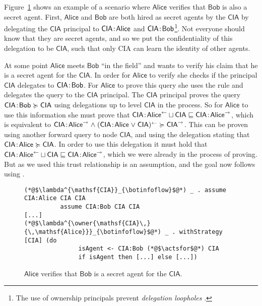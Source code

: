 Figure~\ref{fig:govt-alice-checks-bob} shows an example of a scenario where $\mathsf{Alice}$ verifies that $\mathsf{Bob}$ is also a secret agent. First, $\mathsf{Alice}$ and $\mathsf{Bob}$ are both hired as secret agents by the $\mathsf{CIA}$ by delegating the $\mathsf{CIA}$ principal to $\mathsf{CIA}\!:\!\mathsf{Alice}$ and $\mathsf{CIA}\!:\!\mathsf{Bob}$\footnote{The use of ownership principals prevent \emph{delegation loopholes} \cite{Arden:2015:FA:2859845.2859998}.}. Not everyone should know that they are secret agents, and so we put the confidentiality of this delegation to be $\mathsf{CIA}$, such that only CIA can learn the identity of other agents.

At some point $\mathsf{Alice}$ meets $\mathsf{Bob}$ ``in the field'' and wants to verify his claim that he is a secret agent for the $\mathsf{CIA}$. In order for $\mathsf{Alice}$ to verify she checks if the principal $\mathsf{CIA}$ delegates to $\mathsf{CIA}\!:\!\mathsf{Bob}$. For $\mathsf{Alice}$ to prove this query she uses the  rule and delegates the query to the $\mathsf{CIA}$ principal. The $\mathsf{CIA}$ principal proves the query $\mathsf{CIA}\!:\!\mathsf{Bob} \succcurlyeq \mathsf{CIA}$ using delegations up to level $\mathsf{CIA}$ in the process. So for $\mathsf{Alice}$ to use this information she must prove that $\mathsf{CIA}\!:\!\mathsf{Alice}^{\leftarrow} \sqcup \mathsf{CIA} \sqsubseteq \mathsf{CIA}\!:\!\mathsf{Alice}^{\rightarrow}$, which is equivalent to $\mathsf{CIA}\!:\!\mathsf{Alice}^{\rightarrow} \mathrel{\land} (\mathsf{CIA}\!:\!\mathsf{Alice} \mathrel{\lor} \mathsf{CIA})^{\leftarrow} \succcurlyeq \mathsf{CIA}^{\rightarrow}$. This can be proven using another forward query to node $\mathsf{CIA}$, and using the delegation stating that $\mathsf{CIA}\!:\!\mathsf{Alice} \succcurlyeq \mathsf{CIA}$. In order to use this delegation it must hold that $\mathsf{CIA}\!:\!\mathsf{Alice}^{\leftarrow} \sqcup \mathsf{CIA} \sqsubseteq \mathsf{CIA}\!:\!\mathsf{Alice}^{\rightarrow}$, which we were already in the process of proving. But as we used  this trust relationship is an assumption, and the goal now follows using .

\begin{figure}
\centering
\begin{lstlisting}
(*@$\lambda^{\mathsf{CIA}}_{\botinfoflow}$@*) _ . assume CIA:Alice CIA CIA
          assume CIA:Bob CIA CIA
[...]
(*@$\lambda^{\owner{\mathsf{CIA}\,}{\,\mathsf{Alice}}}_{\botinfoflow}$@*) _ . withStrategy [CIA] (do
               isAgent <- CIA:Bob (*@$\actsfor$@*) CIA
               if isAgent then [...] else [...])
\end{lstlisting}
\caption{$\mathsf{Alice}$ verifies that $\mathsf{Bob}$ is a secret agent for the $\mathsf{CIA}$.}
\label{fig:govt-alice-checks-bob}
\end{figure}